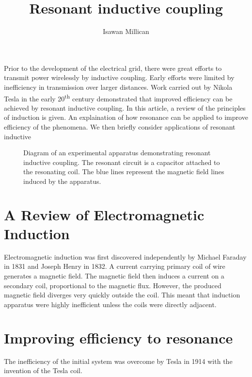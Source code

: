 \documentclass[a4paper,justified,nobib]{tufte-handout}
\begin{document}
\title{Resonant inductive coupling}
\author{Isawan Millican}
\maketitle

Prior to the development of the electrical grid,
there were great efforts to transmit power wirelessly by inductive coupling.
Early efforts were limited by inefficiency in transmission over larger distances.
Work carried out by Nikola Tesla in the early 20\textsuperscript{th} century
demonstrated that improved efficiency can be achieved by resonant inductive coupling.
In this article, a review of the principles of induction is given.
An explaination of how resonance can be applied to improve efficiency of the phenomena.
We then briefly consider applications of resonant inductive 

\begin{figure}
  \center
  
  \caption{Diagram of an experimental apparatus demonstrating resonant inductive coupling.
    The resonant circuit is a capacitor attached to the resonating coil.
    The blue lines represent the magnetic field lines induced by the apparatus.}
\end{figure}

\section{A Review of Electromagnetic Induction}

Electromagnetic induction was first discovered independently by
Michael Faraday in 1831 and Joseph Henry in 1832.\cite{faradaypublishedfirst}
A current carrying primary coil of wire generates a magnetic field.
The magnetic field then induces a current on a secondary coil,
proportional to the magnetic flux.
However, the produced magnetic field diverges very quickly outside the coil.
This meant that induction apparatus were highly inefficient unless the coils
were directly adjacent.

\section{Improving efficiency to resonance}

The inefficiency of the initial system was overcome by Tesla in 1914 with the
invention of the Tesla coil\cite{tesla}.







\printbibliography
\end{document}
